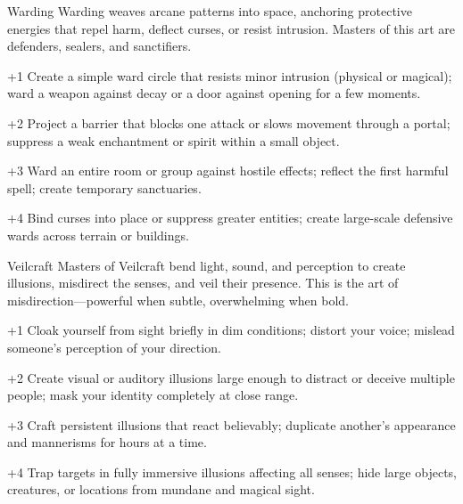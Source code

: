 \begin{WyrdSpell}[Abjuration]{Warding}
    Warding weaves arcane patterns into space, anchoring protective energies that repel harm, deflect curses, or resist intrusion. Masters of this art are defenders, sealers, and sanctifiers.

    \begin{WyrdSpellBlock}
        \item[+1] Create a simple ward circle that resists minor intrusion (physical or magical); ward a weapon against decay or a door against opening for a few moments.
        \item[+2] Project a barrier that blocks one attack or slows movement through a portal; suppress a weak enchantment or spirit within a small object.
        \item[+3] Ward an entire room or group against hostile effects; reflect the first harmful spell; create temporary sanctuaries.
        \item[+4] Bind curses into place or suppress greater entities; create large-scale defensive wards across terrain or buildings.
    \end{WyrdSpellBlock}
\end{WyrdSpell}

\begin{WyrdSpell}[Illusion]{Veilcraft}
    Masters of Veilcraft bend light, sound, and perception to create illusions, misdirect the senses, and veil their presence. This is the art of misdirection—powerful when subtle, overwhelming when bold.

    \begin{WyrdSpellBlock}
        \item[+1] Cloak yourself from sight briefly in dim conditions; distort your voice; mislead someone's perception of your direction.
        \item[+2] Create visual or auditory illusions large enough to distract or deceive multiple people; mask your identity completely at close range.
        \item[+3] Craft persistent illusions that react believably; duplicate another's appearance and mannerisms for hours at a time.
        \item[+4] Trap targets in fully immersive illusions affecting all senses; hide large objects, creatures, or locations from mundane and magical sight.
    \end{WyrdSpellBlock}
\end{WyrdSpell}

